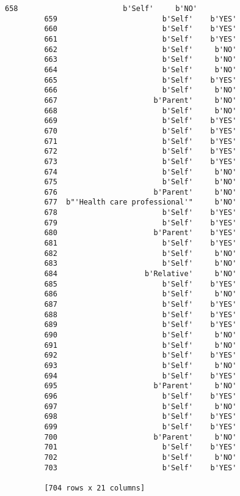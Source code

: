 \documentclass[11pt]{article}
\begin{document}
\begin{Verbatim}[commandchars=\\\{\}]
         658                        b'Self'     b'NO'  
         659                        b'Self'    b'YES'  
         660                        b'Self'    b'YES'  
         661                        b'Self'    b'YES'  
         662                        b'Self'     b'NO'  
         663                        b'Self'     b'NO'  
         664                        b'Self'     b'NO'  
         665                        b'Self'    b'YES'  
         666                        b'Self'     b'NO'  
         667                      b'Parent'     b'NO'  
         668                        b'Self'     b'NO'  
         669                        b'Self'    b'YES'  
         670                        b'Self'    b'YES'  
         671                        b'Self'    b'YES'  
         672                        b'Self'    b'YES'  
         673                        b'Self'    b'YES'  
         674                        b'Self'     b'NO'  
         675                        b'Self'     b'NO'  
         676                      b'Parent'     b'NO'  
         677  b"'Health care professional'"     b'NO'  
         678                        b'Self'    b'YES'  
         679                        b'Self'    b'YES'  
         680                      b'Parent'    b'YES'  
         681                        b'Self'    b'YES'  
         682                        b'Self'     b'NO'  
         683                        b'Self'     b'NO'  
         684                    b'Relative'     b'NO'  
         685                        b'Self'    b'YES'  
         686                        b'Self'     b'NO'  
         687                        b'Self'    b'YES'  
         688                        b'Self'    b'YES'  
         689                        b'Self'    b'YES'  
         690                        b'Self'     b'NO'  
         691                        b'Self'     b'NO'  
         692                        b'Self'    b'YES'  
         693                        b'Self'     b'NO'  
         694                        b'Self'    b'YES'  
         695                      b'Parent'     b'NO'  
         696                        b'Self'    b'YES'  
         697                        b'Self'     b'NO'  
         698                        b'Self'    b'YES'  
         699                        b'Self'    b'YES'  
         700                      b'Parent'     b'NO'  
         701                        b'Self'    b'YES'  
         702                        b'Self'     b'NO'  
         703                        b'Self'    b'YES'  
         
         [704 rows x 21 columns]
\end{Verbatim}
            
\end{document}
